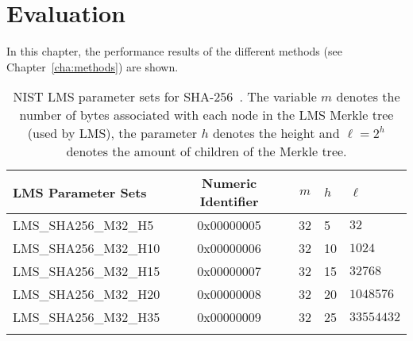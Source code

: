 \chapter{Evaluation} %
\label{cha:evaluation}

In this chapter, the performance results of the different methods (see Chapter~\ref{cha:methods}) are shown.

\begin{table}
\centering
\begin{tabular}{l c c l l} 
 \hline\noalign{\smallskip}
 \textbf{LMS Parameter Sets} & \textbf{Numeric Identifier} & \textbf{$m$} & \textbf{$h$} & $\ell$ \\
 \hline\noalign{\smallskip}
 LMS\_SHA256\_M32\_H5 & 0x00000005  & 32 & 5 & $32$ \\
 LMS\_SHA256\_M32\_H10 & 0x00000006  & 32 & 10 & $1024$ \\
 LMS\_SHA256\_M32\_H15 & 0x00000007  & 32 & 15 & $32768$ \\
 LMS\_SHA256\_M32\_H20 & 0x00000008  & 32 & 20 & $1048576$ \\
 LMS\_SHA256\_M32\_H35 & 0x00000009  & 32 & 25 & $33554432$ \\
 \hline\noalign{\smallskip}
 \end{tabular}
\caption{NIST LMS parameter sets for SHA-256~\cite{stateful_hashbased_sign_schemes_NIST_2020}. The variable $m$ denotes the number of bytes associated with each node in the LMS Merkle tree (used by LMS), the parameter $h$ denotes the height and $\ell = 2^h$ denotes the amount of children of the Merkle tree.} %
\label{table:nist_param_lms}
\end{table}

